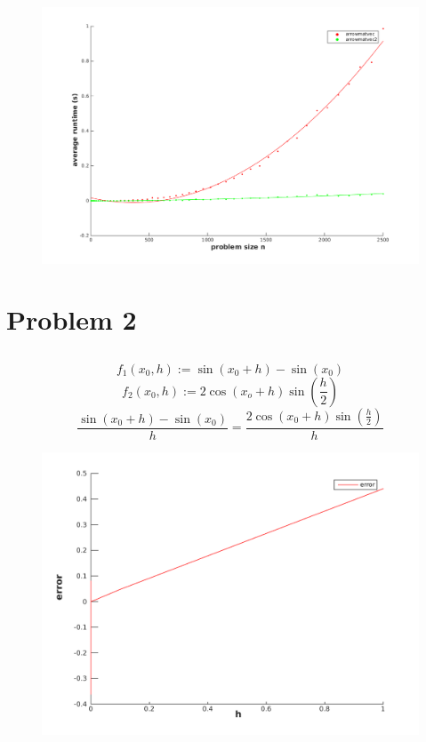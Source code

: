 \begin{figure}[H]
  \centering\includegraphics[scale=0.65]{./e1e.png}
\end{figure}

\subsection{}


\section{Problem 2}
\subsection{}
$$ f_1(x_0,h) := \sin(x_0+h)-\sin(x_0) $$
$$ f_2(x_0,h) := 2\cos(x_o+h)\sin\left(\frac{h}{2}\right) $$
$$ \frac{\sin(x_0+h)-\sin(x_0)}{h} = \frac{2\cos(x_0+h)\sin\left(\frac{h}{2}\right)}{h} $$

\begin{figure}[H]
  \centering\includegraphics[scale=0.8]{./e2a.png}
\end{figure}

